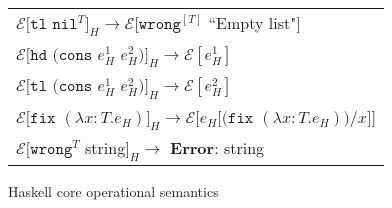 \begin{figure}[p]
\begin{tabular}{l}
\vspace{5pt}

$\mathscr{E}[\mathtt{tl}$ $\mathtt{nil}^{T}]_{H}\rightarrow\mathscr{E}[\mathtt{wrong}^{[T]}$ ``Empty list"$]$ \\

\vspace{5pt}

$\mathscr{E}[\mathtt{hd}$ $(\mathtt{cons}$ $e_{H}^{1}$ $e_{H}^{2})]_{H}\rightarrow\mathscr{E}[e_{H}^{1}]$ \\

\vspace{5pt}

$\mathscr{E}[\mathtt{tl}$ $(\mathtt{cons}$ $e_{H}^{1}$ $e_{H}^{2})]_{H}\rightarrow\mathscr{E}[e_{H}^{2}]$ \\

\vspace{5pt}

$\mathscr{E}[\mathtt{fix}$ $(\lambda x:T.e_{H})]_{H}\rightarrow\mathscr{E}[e_{H}[(\mathtt{fix}$ $(\lambda x:T.e_{H}))/x]]$ \\

\vspace{5pt}

$\mathscr{E}[\mathtt{wrong}^{T}$ string$]_{H}\rightarrow$ \textbf{Error}: string
\end{tabular}
\caption{Haskell core operational semantics}
\label{chos}
\end{figure}
